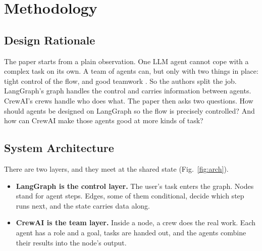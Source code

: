 \documentclass[12pt,a4paper]{report}
\begin{document}
\chapter{Methodology}

\section{Design Rationale}

The paper starts from a plain observation. One LLM agent cannot cope with a complex task on its own. A team of agents can, but only with two things in place: tight control of the flow, and good teamwork \cite{duan2024langgraphcrewai}. So the authors split the job. LangGraph's graph handles the control and carries information between agents. CrewAI's crews handle who does what. The paper then asks two questions. How should agents be designed on LangGraph so the flow is precisely controlled? And how can CrewAI make those agents good at more kinds of task?

\section{System Architecture}

There are two layers, and they meet at the shared state (Fig.~\ref{fig:arch}).

\begin{itemize}
    \item \textbf{LangGraph is the control layer.} The user's task enters the graph. Nodes stand for agent steps. Edges, some of them conditional, decide which step runs next, and the state carries data along.
    \item \textbf{CrewAI is the team layer.} Inside a node, a crew does the real work. Each agent has a role and a goal, tasks are handed out, and the agents combine their results into the node's output.
\end{itemize}
\end{document}
